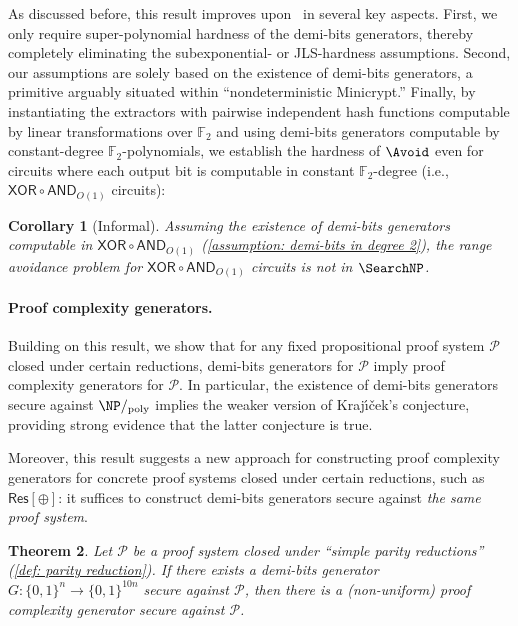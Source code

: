 \documentclass[10pt,a4paper]{article}
\newtheorem{theorem}{Theorem}[section]
\newtheorem{corollary}[theorem]{Corollary}
\theoremstyle{definition}
\theoremstyle{remark}
\renewcommand{\poly}{\mathrm{poly}}
\newcommand{\Res}{\mathsf{Res}}
\newcommand{\AND}{\mathsf{AND}}
\newcommand{\XOR}{\mathsf{XOR}}
\newcommand{\calP}{\mathcal{P}}
\newcommand{\F}{\mathbb{F}}
\newcommand{\Krajicek}{Kraj\'{\i}\v{c}ek\xspace}
\begin{document}
As discussed before, this result improves upon~\cite{DBLP:conf/stoc/IlangoLW23, DBLP:conf/stoc/ChenL24} in several key aspects. First, we only require super-polynomial hardness of the demi-bits generators, thereby completely eliminating the subexponential- or JLS-hardness assumptions. Second, our assumptions are solely based on the existence of demi-bits generators, a primitive arguably situated within ``nondeterministic Minicrypt.'' 
Finally, by instantiating the extractors with pairwise independent hash functions computable by linear transformations over $\F_2$ and using demi-bits generators computable by constant-degree $\F_2$-polynomials, we establish the hardness of $\Avoid$ even for circuits where each output bit is computable in constant $\F_2$-degree (i.e., $\XOR\circ\AND_{O(1)}$ circuits):

\begin{corollary}[Informal]\label{cor: main degree-O(1) Avoid notin FP}
	Assuming the existence of demi-bits generators computable in $\XOR\circ\AND_{O(1)}$ (\autoref{assumption: demi-bits in degree 2}), the range avoidance problem for $\XOR\circ\AND_{O(1)}$ circuits is not in $\SearchNP$.
\end{corollary}



\paragraph{Proof complexity generators.} Building on this result, we show that for any fixed propositional proof system $\calP$ closed under certain reductions, demi-bits generators for $\calP$ imply proof complexity generators for $\calP$. In particular, the existence of demi-bits generators secure against $\NP/_\poly$ implies the weaker version of \Krajicek's conjecture, providing strong evidence that the latter conjecture is true. 

Moreover, this result suggests a new approach for constructing proof complexity generators for concrete proof systems closed under certain reductions, such as $\Res[\oplus]$: it suffices to construct demi-bits generators secure against \emph{the same proof system}.



\begin{theorem}\label{thm: main pcg}
    Let $\calP$ be a proof system closed under ``simple parity reductions'' (\autoref{def: parity reduction}). If there exists a demi-bits generator $G: \{0, 1\}^n \to \{0, 1\}^{10n}$ secure against $\calP$, then there is a (non-uniform) proof complexity generator secure against $\calP$.
\end{theorem}
\end{document}

